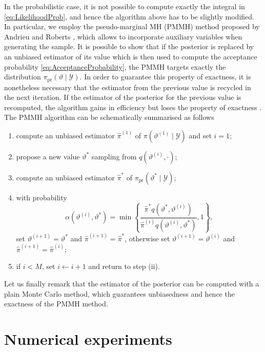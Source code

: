 \documentclass{siamart1116}
\numberwithin{theorem}{section}
\renewcommand{\theta}{\vartheta}
\newcommand{\corr}[1]{{\color{bordeaux}#1}}
\begin{document}
In the probabilistic case, it is not possible to compute exactly the integral in \eqref{eq:LikelihoodProb}, and hence the algorithm above has to be slightly modified. In particular, we employ the pseudo-marginal MH (PMMH) method proposed by Andrieu and Roberts \cite{AnR09}, which allows to incorporate auxiliary variables when generating the sample. It is possible to show that if the posterior is replaced by an unbiased estimator of its value which is then used to compute the acceptance probability \eqref{eq:AcceptanceProbability}, the PMMH targets exactly the distribution $\pi_{\mathrm{pr}}(\theta \mid \mathcal{Y})$. In order to guarantee this property of exactness, it is nonetheless necessary that the estimator from the previous value is recycled in the next iteration. If the estimator of the posterior for the previous value is recomputed, the algorithm gains in efficiency but loses the property of exactness \cite{MLR16}. The PMMH algorithm can be schematically summarised as follows
\begin{enumerate}
	\item compute an unbiased estimator $\hat{\pi}^{(1)}$ of $\pi(\theta^{(1)}\mid \mathcal{Y})$ and set $i = 1$;
	\item propose a new value $\theta^*$ sampling from $q(\theta^{(i)}, \cdot)$;
	\item compute an unbiased estimator $\hat{\pi}^*$ of $\pi_{\mathrm{pr}}(\theta^*\mid\mathcal{Y})$;
	\item with probability 
		\corr{\begin{equation}\label{eq:AcceptanceProbabilityProb}
			\alpha(\theta^{(i)}, \theta^*) = \min\left\{\frac{\hat{\pi}^* q(\theta^*, \theta^{(i)})}{\hat{\pi}^{(i)}q(\theta^{(i)}, \theta^*)}, 1\right\},
		\end{equation}}
	set $\theta^{(i+1)} = \theta^*$ and $\hat{\pi}^{(i+1)} = \hat{\pi}^*$, otherwise set $\theta^{(i+1)} = \theta^{(i)}$ and $\hat{\pi}^{(i+1)} = \hat{\pi}^{(i)}$;
	\item if $i < M$, set $i \leftarrow i + 1$ and return to step (ii).
\end{enumerate}
Let us finally remark that the estimator \corr{of the} posterior can be computed with a plain Monte Carlo method, which guarantees unbiasedness and hence the exactness of the PMMH method.

\section{Numerical experiments}\label{sec:NumericalExperiments}
\end{document}
